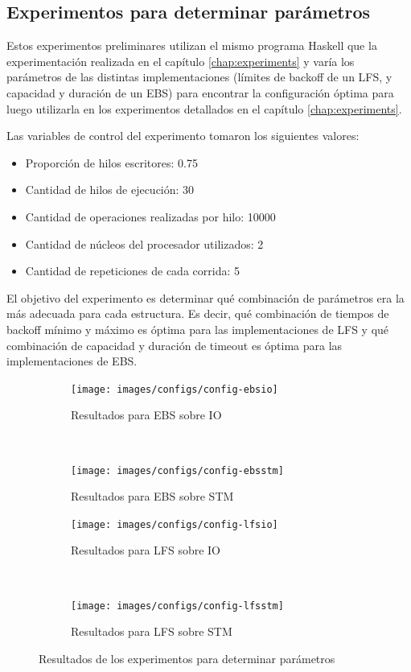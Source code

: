 \begin{appendices}
\chapter{Experimentos para determinar parámetros}\label{config-experiments}

Estos experimentos preliminares utilizan el mismo programa Haskell que la experimentación realizada en el capítulo \ref{chap:experiments} y varía los parámetros de las distintas implementaciones (límites de backoff de un LFS, y capacidad y duración de un EBS) para encontrar la configuración óptima para luego utilizarla en los experimentos detallados en el capítulo \ref{chap:experiments}.

Las variables de control del experimento tomaron los siguientes valores:

\begin{itemize}
    \item Proporción de hilos escritores: 0.75
    \item Cantidad de hilos de ejecución: 30
    \item Cantidad de operaciones realizadas por hilo: 10000
    \item Cantidad de núcleos del procesador utilizados: 2
    \item Cantidad de repeticiones de cada corrida: 5
\end{itemize}

El objetivo del experimento es determinar qué combinación de parámetros era la más adecuada para cada estructura. Es decir, qué combinación de tiempos de backoff mínimo y máximo es óptima para las implementaciones de LFS y qué combinación de capacidad y duración de timeout es óptima para las implementaciones de EBS.

\begin{figure}[H]
    \begin{subfigure}[b]{0.49\textwidth}
        \texttt{[image: images/configs/config-ebsio]}
        \caption{Resultados para EBS sobre IO}
        \label{config-ebsio}
    \end{subfigure}
    ~
    \begin{subfigure}[b]{0.49\textwidth}
        \texttt{[image: images/configs/config-ebsstm]}
        \caption{Resultados para EBS sobre STM}
        \label{config-ebsstm}
    \end{subfigure}
    \begin{subfigure}[b]{0.49\textwidth}
        \texttt{[image: images/configs/config-lfsio]}
        \caption{Resultados para LFS sobre IO}
        \label{config-lfsio}
    \end{subfigure}
    ~
    \begin{subfigure}[b]{0.49\textwidth}
        \texttt{[image: images/configs/config-lfsstm]}
        \caption{Resultados para LFS sobre STM}
        \label{config-lfsstm}
    \end{subfigure}
    \caption{Resultados de los experimentos para determinar parámetros}
\end{figure}


\end{appendices}

